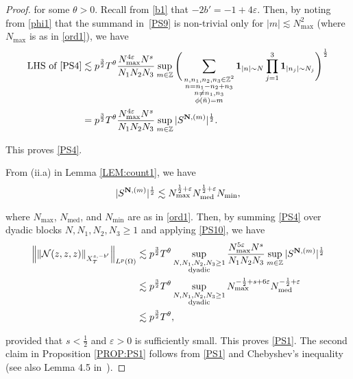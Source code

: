 \documentclass[%
11pt,  reqno]{amsart}
\DeclareMathOperator{\med}{med}
\newcommand{\1}{\hspace{0.2mm}\text{I}\hspace{0.2mm}}
\newcommand{\noi}{\noindent}
\newcommand{\Z}{\mathbb{Z}}
\newcommand{\eps}{\varepsilon}
\newcommand{\ta}{\theta}
\renewcommand{\O}{\Omega}
\newcommand{\les}{\lesssim}
\newcommand{\ind}{\mathbf 1}
\newcommand{\NN}{\mathcal{N}}
\numberwithin{equation}{section}
\numberwithin{theorem}{section}
\begin{document}
\begin{proof}
\noi
for some $\ta > 0$.
Recall from 
\eqref{b1}
that $-2b' = -1 + 4\eps$.
Then, by noting 
from \eqref{phi1}
that the summand in~\eqref{PS9} is non-trivial
only for  $|m | \les N_{\max}^2$
(where $N_{\max}$ is as in \eqref{ord1}), we have
 \begin{align*}
 \text{LHS of \eqref{PS4}}
& \les p^\frac 32 T^\ta
 \frac{ N_{\max}^{4\eps}N^{s}}{N_1 N_2 N_3}  \sup_{m \in \Z} 
\Bigg( \sum_{\substack{n, n_1, n_2, n_3 \in \Z^2\\n =  n_1 - n_2 + n_3\\ n \neq n_1, n_3 \\ \phi (\bar n) = m}}  
\ind_{|n|\sim N} \prod_{j=1}^3 \ind_{|n_j|\sim N_j} \Bigg)^\frac 12 \\
& = 
p^\frac 32 T^\ta
 \frac{ N_{\max}^{4\eps}N^{s}}{N_1 N_2 N_3} \sup_{m \in \Z} 
|S^{{\bf N}, (m)}|^\frac 12.
\end{align*}

\noi 
This proves  \eqref{PS4}.







From (ii.a)  in Lemma \ref{LEM:count1}, we have  
\begin{align}
|S^{{\bf N}, (m)}|^\frac 12
\les N_{\max}^{\frac 12 + \eps}
N_{\med}^{\frac 12 + \eps}
N_{\min}, 
\label{PS10}
\end{align}



\noi
where
$N_{\max}$, 
$N_{\med}$, and 
$N_{\min}$ are as in \eqref{ord1}.
Then, 
by summing 
  \eqref{PS4} over dyadic blocks $N, N_1, N_2, N_3 \ge1$
and applying \eqref{PS10}, 
we have 
\begin{align*}
\Big\|
 \| \NN(z, z, z)\|_{X^{s,-b'}_T}\Big\|_{L^p(\O)}
&  \les 
p^\frac 32 T^\ta
\sup_{\substack{N, N_1, N_2, N_3\ge 1\\\text{dyadic}}}
 \frac{ N_{\max}^{5\eps }N^{s}}{N_1 N_2 N_3} \sup_{m \in \Z} 
|S^{{\bf N}, (m)}|^\frac 12\\
& \les 
p^\frac 32 T^\ta
\sup_{\substack{N, N_1, N_2, N_3\ge 1\\\text{dyadic}}}
N_{\max}^{-\frac 12 + s +6\eps}
N_{\med}^{-\frac 12 + \eps}\\
& \les 
p^\frac 32 T^\ta, 
\end{align*}


\noi
provided that $s < \frac 12$ and $\eps > 0$ is sufficiently small.
This proves \eqref{PS1}.
The second claim in 
Proposition \ref{PROP:PS1}
follows  from 
\eqref{PS1} and 
Chebyshev's inequality (see also Lemma 4.5 in~\cite{TzvBO}).
\end{proof}
\end{document}
